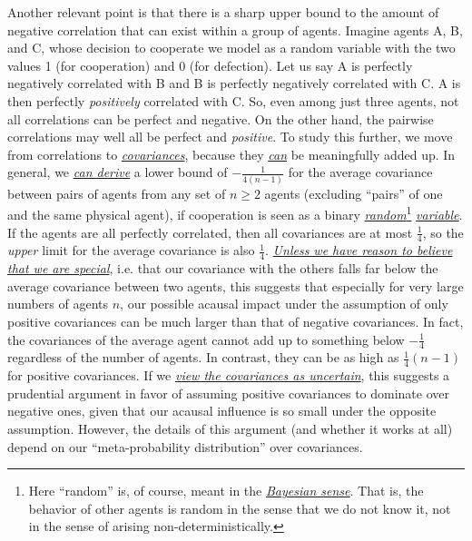 Another relevant point is that there is a sharp upper bound to the
amount of negative correlation that can exist within a group of agents.
Imagine agents A, B, and C, whose decision to cooperate we model as a
random variable with the two values 1 (for cooperation) and 0 (for
defection). Let us say A is perfectly negatively correlated with B and B
is perfectly negatively correlated with C. A is then perfectly
\emph{positively} correlated with C. So, even among just three agents,
not all correlations can be perfect and negative. On the other hand, the
pairwise correlations may well all be perfect and \emph{positive}. To
study this further, we move from correlations to
\href{https://en.wikipedia.org/wiki/Covariance}{\emph{covariances}},
because they
\href{https://en.wikipedia.org/wiki/Covariance\#Properties}{\emph{can}}
be meaningfully added up. In general, we
\href{https://casparoesterheld.files.wordpress.com/2017/01/lowerboundavgcov.pdf}{\emph{can
derive}} a lower bound of \(- \frac{1}{4(n - 1)}\) for the average
covariance between pairs of agents from any set of \(n \geq 2\) agents
(excluding ``pairs'' of one and the same physical agent), if cooperation
is seen as a binary
\href{https://en.wikipedia.org/wiki/Random_variable}{\emph{random}}\footnote{Here
  ``random'' is, of course, meant in the
  \href{https://en.wikipedia.org/wiki/Bayesian_probability}{\emph{Bayesian
  sense}}. That is, the behavior of other agents is random in the sense
  that we do not know it, not in the sense of arising
  non-deterministically.}
\href{https://en.wikipedia.org/wiki/Random_variable}{\emph{variable}}.
If the agents are all perfectly correlated, then all covariances are at
most \(\frac{1}{4}\), so the \emph{upper} limit for the average
covariance is also \(\frac{1}{4}\).
\href{https://en.wikipedia.org/wiki/Mediocrity_principle}{\emph{Unless
we have reason to believe that we are special}}, i.e. that our
covariance with the others falls far below the average covariance
between two agents, this suggests that especially for very large numbers
of agents \(n\), our possible acausal impact under the assumption of
only positive covariances can be much larger than that of negative
covariances. In fact, the covariances of the average agent cannot add up
to something below \(- \frac{1}{4}\) regardless of the number of agents.
In contrast, they can be as high as \(\frac{1}{4}(n - 1)\) for positive
covariances. If we
\href{https://casparoesterheld.com/2016/10/21/environmental-and-logical-uncertainty-reported-environmental-probabilities-as-expected-environmental-probabilities-under-logical-uncertainty/}{\emph{view
the covariances as uncertain}}, this suggests a prudential argument in
favor of assuming positive covariances to dominate over negative ones,
given that our acausal influence is so small under the opposite
assumption. However, the details of this argument (and whether it works
at all) depend on our ``meta-probability distribution'' over
covariances.

